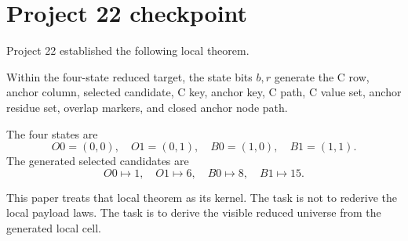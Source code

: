 \section{Project 22 checkpoint}

Project 22 established the following local theorem.

\begin{theorem}
Within the four-state reduced target, the state bits \(b,r\) generate the C row, anchor column, selected candidate, C key, anchor key, C path, C value set, anchor residue set, overlap markers, and closed anchor node path.
\end{theorem}

The four states are
\[
    O0=(0,0),\quad O1=(0,1),\quad B0=(1,0),\quad B1=(1,1).
\]
The generated selected candidates are
\[
    O0\mapsto 1,\quad O1\mapsto 6,\quad B0\mapsto 8,\quad B1\mapsto 15.
\]

This paper treats that local theorem as its kernel.  The task is not to rederive the local payload laws.  The task is to derive the visible reduced universe from the generated local cell.
